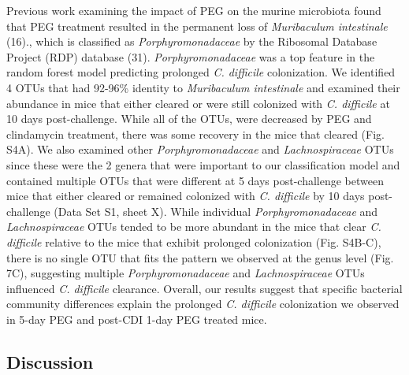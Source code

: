 \documentclass[
  11pt,
]{article}
\begin{document}
Previous work examining the impact of PEG on the murine microbiota found
that PEG treatment resulted in the permanent loss of \emph{Muribaculum
intestinale} (16)., which is classified as \emph{Porphyromonadaceae} by
the Ribosomal Database Project (RDP) database (31).
\emph{Porphyromonadaceae} was a top feature in the random forest model
predicting prolonged \emph{C. difficile} colonization. We identified 4
OTUs that had 92-96\% identity to \emph{Muribaculum intestinale} and
examined their abundance in mice that either cleared or were still
colonized with \emph{C. difficile} at 10 days post-challenge. While all
of the OTUs, were decreased by PEG and clindamycin treatment, there was
some recovery in the mice that cleared (Fig. S4A). We also examined
other \emph{Porphyromonadaceae} and \emph{Lachnospiraceae} OTUs since
these were the 2 genera that were important to our classification model
and contained multiple OTUs that were different at 5 days post-challenge
between mice that either cleared or remained colonized with \emph{C.
difficile} by 10 days post-challenge (Data Set S1, sheet X). While
individual \emph{Porphyromonadaceae} and \emph{Lachnospiraceae} OTUs
tended to be more abundant in the mice that clear \emph{C. difficile}
relative to the mice that exhibit prolonged colonization (Fig. S4B-C),
there is no single OTU that fits the pattern we observed at the genus
level (Fig. 7C), suggesting multiple \emph{Porphyromonadaceae} and
\emph{Lachnospiraceae} OTUs influenced \emph{C. difficile} clearance.
Overall, our results suggest that specific bacterial community
differences explain the prolonged \emph{C. difficile} colonization we
observed in 5-day PEG and post-CDI 1-day PEG treated mice.

\hypertarget{discussion}{%
\subsection{Discussion}\label{discussion}}
\end{document}
